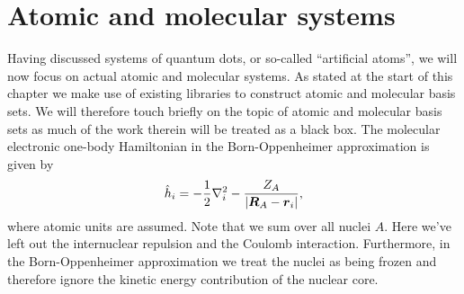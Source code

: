     \section{Atomic and molecular systems}
        \label{sec:atoms-and-molecules}
        Having discussed systems of quantum dots, or so-called ``artificial
        atoms'', we will now focus on actual atomic and molecular systems.
        As stated at the start of this chapter we make use of existing
        libraries to construct atomic and molecular basis sets.
        We will therefore touch briefly on the topic of atomic and molecular
        basis sets as much of the work therein will be treated as a black box.
        The molecular electronic one-body Hamiltonian in the Born-Oppenheimer
        approximation is given by \cite{basis-sets, hochstuhl2014time}
        \begin{align}
            \hat{h}_i
            = -\frac{1}{2} \nabla^2_i
            - \frac{Z_A}{\abs{\boldsymbol{R}_A - \boldsymbol{r}_i}},
        \end{align}
        where atomic units are assumed.
        Note that we sum over all nuclei $A$.
        Here we've left out the internuclear repulsion and the Coulomb
        interaction.
        Furthermore, in the Born-Oppenheimer approximation we treat the nuclei
        as being frozen and therefore ignore the kinetic energy contribution of
        the nuclear core.

